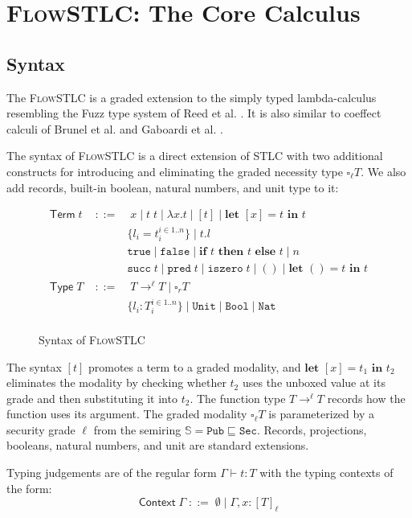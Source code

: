 \documentclass[conference]{IEEEtran}
\newcommand\unp[3]{\textbf{let }[#1]=#2\textbf{ in }#3}
\newcommand\une[2]{\textbf{let }\unt=#1\textbf{ in }#2}
\newcommand\gradedt[2]{\square_{#1} #2}
\newcommand\public{\texttt{Pub}}
\newcommand\secret{\texttt{Sec}}
\newcommand\secure{\mathbb{S}}
\newcommand\true{\texttt{true}}
\newcommand\false{\texttt{false}}
\newcommand\bool{\texttt{Bool}}
\newcommand\nat{\texttt{Nat}}
\newcommand\suc[1]{\texttt{succ}\; #1}
\newcommand\prd[1]{\texttt{pred}\; #1}
\newcommand\iszero[1]{\texttt{iszero}\; #1}
\newcommand\unt{()}
\newcommand\untt{\texttt{Unit}}
\newcommand\cond[3]{\textbf{if }#1\textbf{ then }#2\textbf{ else }#3}
\begin{document}
\section{\textsc{FlowSTLC}: The Core Calculus}
\subsection{Syntax}

The \textsc{FlowSTLC} is a graded extension to the simply typed lambda-calculus resembling the Fuzz type system of Reed et al. \cite{reeddistance}. It is also similar to coeffect calculi of Brunel et al. \cite{brunel2014core} and Gaboardi et al. \cite{gaboardi2016combining}.

The syntax of \textsc{FlowSTLC} is a direct extension of STLC with two additional constructs for introducing and eliminating the graded necessity type $\gradedt{\ell}{T}$. We also add records, built-in boolean, natural numbers, and unit type to it:

\begin{figure}[H]
	\centering
	$$
	\begin{aligned}
		\textsf{Term}\;t\;&::=&\;x\;|\;t\; t\;|\;\lambda x.t\;|\;[t]\;|\;\textbf{let }[x]=t\textbf{ in }t\\
		&&\{l_i=t_i^{i\in1..n}\}\;|\;t.l\\
		&&\true\;|\;\false\;|\;\cond{t}{t}{t}\;|\; n\\
		&&\suc{t}\;|\;\prd{t}\;|\;\iszero{t}\;|\;\unt\;|\;\une{t}{t}\\
		\textsf{Type}\;T\;&::=&\;T\to^\ell T\;|\;\square_r T\\
		&&\{l_i:T_i^{i\in1..n}\}\;|\;\untt\;|\;\bool\;|\;\nat\\
	\end{aligned}
	$$
	\caption{Syntax of \textsc{FlowSTLC}}
\end{figure}

The syntax $[t]$ promotes a term to a graded modality, and $\unp{x}{t_1}{t_2}$ eliminates the modality by checking whether $t_2$ uses the unboxed value at its grade and then substituting it into $t_2$. The function type $T\to^\ell T$ records how the function uses its argument. The graded modality $\gradedt{\ell}{T}$ is parameterized by a security grade $\ell$ from the semiring $\secure=\public\sqsubseteq\secret$. Records, projections, booleans, natural numbers, and unit are standard extensions.

Typing judgements are of the regular form $\Gamma\vdash t:T$ with the typing contexts of the form:
$$
\textsf{Context}\;\Gamma\;::=\;\emptyset\;|\;\Gamma,x:[T]_\ell
$$
\end{document}
